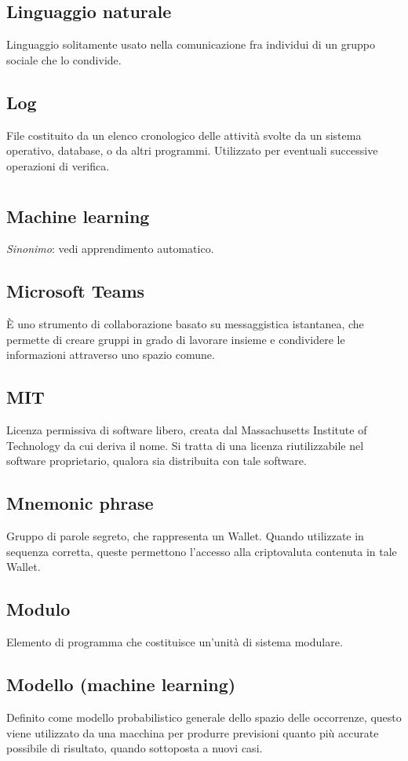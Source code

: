 	\subsection*{Linguaggio naturale}
	Linguaggio solitamente usato nella comunicazione fra individui di un gruppo sociale che lo condivide.
	\subsection*{Log}
	File costituito da un elenco cronologico delle attività svolte da un sistema operativo, database, o da altri programmi. Utilizzato per eventuali successive operazioni di verifica.
\pagebreak
\section[M]{}
	\subsection*{Machine learning}
	\emph{Sinonimo}: vedi apprendimento automatico.
	\subsection*{Microsoft Teams}
	È uno strumento di collaborazione basato su messaggistica istantanea, che permette di creare gruppi in grado di lavorare insieme e condividere le informazioni attraverso uno spazio comune.
	\subsection*{MIT}
	Licenza permissiva di software libero, creata dal Massachusetts Institute of Technology da cui deriva il nome. Si tratta di una licenza riutilizzabile nel software proprietario, qualora sia distribuita con tale software.
	\subsection*{Mnemonic phrase}
	Gruppo di parole segreto, che rappresenta un Wallet. Quando utilizzate in sequenza corretta, queste permettono l’accesso alla criptovaluta contenuta in tale Wallet.
	\subsection*{Modulo}
	Elemento di programma che costituisce un’unità di sistema modulare.
	\subsection*{Modello (machine learning)}
	Definito come modello probabilistico generale dello spazio delle occorrenze, questo viene utilizzato da una macchina per produrre previsioni quanto più accurate possibile di risultato, quando sottoposta a nuovi casi.
\pagebreak
